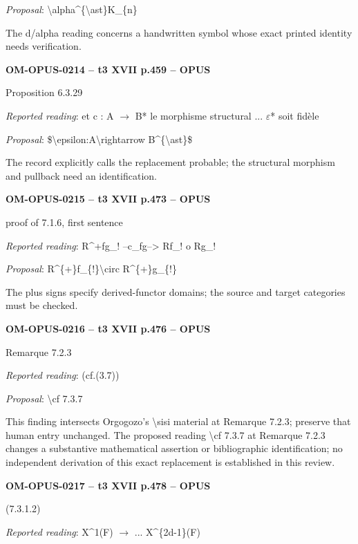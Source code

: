 \emph{Proposal}: \textbackslash{}alpha\textasciicircum{}\{\textbackslash{}ast\}K\_\{n\}\par
The d/alpha reading concerns a handwritten symbol whose exact printed identity needs verification.\par
\par\noindent\textbf{OM-OPUS-0214 -- t3 XVII p.459 -- OPUS}\par
Proposition 6.3.29\par
\emph{Reported reading}: et c : A \ensuremath{\to} B* le morphisme structural ... \ensuremath{\varepsilon}* soit fidèle\par
\emph{Proposal}: \$\textbackslash{}epsilon:A\textbackslash{}rightarrow B\textasciicircum{}\{\textbackslash{}ast\}\$\par
The record explicitly calls the replacement probable; the structural morphism and pullback need an identification.\par
\par\noindent\textbf{OM-OPUS-0215 -- t3 XVII p.473 -- OPUS}\par
proof of 7.1.6, first sentence\par
\emph{Reported reading}: R\textasciicircum{}+fg\_! --c\_fg--> Rf\_! o Rg\_!\par
\emph{Proposal}: R\textasciicircum{}\{+\}f\_\{!\}\textbackslash{}circ R\textasciicircum{}\{+\}g\_\{!\}\par
The plus signs specify derived-functor domains; the source and target categories must be checked.\par
\par\noindent\textbf{OM-OPUS-0216 -- t3 XVII p.476 -- OPUS}\par
Remarque 7.2.3\par
\emph{Reported reading}: (cf.(3.7))\par
\emph{Proposal}: \textbackslash{}cf 7.3.7\par
This finding intersects Orgogozo's \textbackslash{}sisi material at Remarque 7.2.3; preserve that human entry unchanged. The proposed reading \textbackslash{}cf 7.3.7 at Remarque 7.2.3 changes a substantive mathematical assertion or bibliographic identification; no independent derivation of this exact replacement is established in this review.\par
\par\noindent\textbf{OM-OPUS-0217 -- t3 XVII p.478 -- OPUS}\par
(7.3.1.2)\par
\emph{Reported reading}: X\textasciicircum{}1(F) \ensuremath{\to} ... X\textasciicircum{}\{2d-1\}(F)\par
